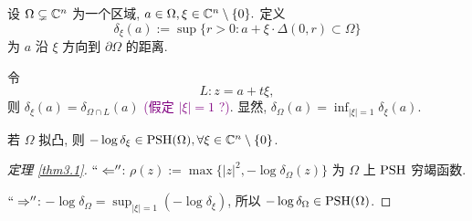 \begin{definition}
    设 $\Omega \subsetneq {\mathbb C}^n$ 为一个区域, $a \in \Omega , \xi \in {\mathbb C}^n \setminus \{0\}.$ 定义 
    $$ \delta _{\xi }(a):= \sup \{r>0: a+\xi \cdot \Delta (0,r) \subset \Omega \} $$  
    为 $a$ 沿 $\xi $  方向到 $\partial \Omega $ 的距离. 
\end{definition}
\begin{remark}
    令 
    $$ L:z=a+t \xi  ,$$
    则  $\delta _{\xi }(a)=\delta _{\Omega \cap L}(a)$ \textcolor{purple}{(假定 $|\xi |=1$ ?)}. 
    显然, $\delta _{\Omega }(a)=\inf_{\left| \xi  \right| =1} \delta _{\xi }(a)$.  
\end{remark}

\begin{lemma}[Oka]
   若 $\Omega $ 拟凸, 则 $-\log \delta _{\xi } \in \operatorname{PSH} (\Omega ), \forall \xi \in {\mathbb C}^{n} \setminus \{0\}$.  
\end{lemma}

\begin{proof}[定理 \ref{thm3.1}]
    $``\Leftarrow ''$: $\rho (z):=\max \{\left| z \right| ^2,-\log \delta _{\Omega }(z)\} $ 为 $\Omega $ 上 $\operatorname{PSH}$ 穷竭函数.
    
    $``\Rightarrow'' $: $-\log \delta _{\Omega }=\sup_{\left| \xi  \right| =1} (-\log \delta _{\xi })$, 所以 $-\log \delta _{\Omega } \in \operatorname{PSH}(\Omega )$.   
\end{proof}

